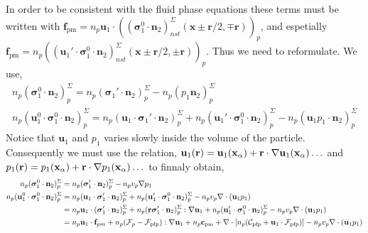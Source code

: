 In order to be consistent with the fluid phase equations these terms must be written with $\textbf{f}_\text{pm} = n_p\textbf{u}_1 \cdot ((\bm{\sigma}_1^0 \cdot  \textbf{n}_2)^\Sigma_{nst}(\textbf{x} \pm \textbf{r}/2,\mp\textbf{r}) )_p$, and espetially  $\textbf{f}_\text{pm} = n_p ((\textbf{u}_1' \cdot\bm{\sigma}_1^0 \cdot  \textbf{n}_2)^\Sigma_{nst}(\textbf{x} \pm \textbf{r}/2,\pm\textbf{r}))_p$. Thus we need to reformulate. 
We use, 
\begin{align*}
    n_p (\bm{\sigma}_1^0 \cdot  \textbf{n}_2)^\Sigma_p
    = 
    n_p ( \bm{\sigma}_1' \cdot  \textbf{n}_2)^\Sigma_p
    - n_p (p_1   \textbf{n}_2)^\Sigma_p\\
    n_p (\textbf{u}_1^0 \cdot \bm{\sigma}_1^0 \cdot  \textbf{n}_2)^\Sigma_p
    = 
    n_p (\textbf{u}_1 \cdot \bm{\sigma}_1' \cdot  \textbf{n}_2)^\Sigma_p
    + n_p (\textbf{u}_1' \cdot \bm{\sigma}_1^0 \cdot  \textbf{n}_2)^\Sigma_p
    - n_p (\textbf{u}_1 p_1 \cdot  \textbf{n}_2)^\Sigma_p
\end{align*}
Notice that $\textbf{u}_1$ and $p_1$ varies slowly inside the volume of the particle.
Consequently we must use the relation, $\textbf{u}_1(\textbf{r}) = \textbf{u}_1(\textbf{x}_\alpha) + \textbf{r} \cdot\mathbf{\nabla} \textbf{u}_1(\textbf{x}_\alpha) \ldots$
and $p_1(\textbf{r}) = p_1(\textbf{x}_\alpha) + \textbf{r} \cdot\mathbf{\nabla} p_1(\textbf{x}_\alpha) \ldots$
to finnaly obtain, 
\begin{align*}
    n_p (\bm{\sigma}_1^0 \cdot  \textbf{n}_2)^\Sigma_p
    &= 
    n_p ( \bm{\sigma}_1' \cdot  \textbf{n}_2)^\Sigma_p
    - n_p v_p \mathbf{\nabla} p_1\\
    n_p (\textbf{u}_1^0 \cdot \bm{\sigma}_1^0 \cdot  \textbf{n}_2)^\Sigma_p
    &= 
    n_p (\textbf{u}_1 \cdot \bm{\sigma}_1' \cdot  \textbf{n}_2)^\Sigma_p
    + n_p (\textbf{u}_1' \cdot \bm{\sigma}_1^0 \cdot  \textbf{n}_2)^\Sigma_p
    - n_p v_p \mathbf{\nabla}\cdot (\textbf{u}_1 p_1) \\
    &= 
    n_p \textbf{u}_1 \cdot( \bm{\sigma}_1' \cdot  \textbf{n}_2)^\Sigma_p
    + n_p (\textbf{r} \bm{\sigma}_1' \cdot  \textbf{n}_2)^\Sigma_p : \mathbf{\nabla} \textbf{u}_1
    + n_p (\textbf{u}_1' \cdot \bm{\sigma}_1^0 \cdot  \textbf{n}_2)^\Sigma_p
    - n_p v_p \mathbf{\nabla}\cdot (\textbf{u}_1 p_1) \\
    &= 
    n_p \textbf{u}_1 \cdot \textbf{f}_{pm}
    + n_p (\mathcal{F}_p - \mathcal{F}_\text{pfp}): \mathbf{\nabla} \textbf{u}_1
    + n_p \textbf{c}_\text{pm}
    + \mathbf{\nabla}\cdot [n_p(\mathcal{C}_\text{pfp} + \textbf{u}_1 \cdot \mathcal{F}_\text{pfp})]
    - n_p v_p \mathbf{\nabla}\cdot (\textbf{u}_1 p_1) 
\end{align*}

